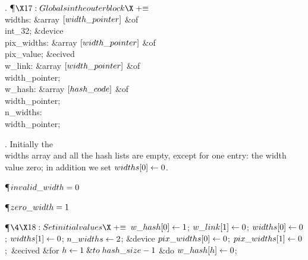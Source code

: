 . \P$\X17:Globals in the outer block\X\mathrel{+}\S$\6
\4\\{widths}: \&{array} $[\\{width\_pointer}]$ \1\&{of}\5
\\{int\_32};\2\6
\&{device} \\{pix\_widths}: \&{array} $[\\{width\_pointer}]$ \1\&{of}\5
\\{pix\_value};\2\6
\&{ecived}\6
\4\\{w\_link}: \&{array} $[\\{width\_pointer}]$ \1\&{of}\5
\\{width\_pointer};\2\6
\4\\{w\_hash}: \&{array} $[\\{hash\_code}]$ \1\&{of}\5
\\{width\_pointer};\2\6
\4\\{n\_widths}: \\{width\_pointer};\par
\fi

. Initially the \\{widths} array and all the hash lists are empty, except
for one entry: the width value zero; in addition we set $\\{widths}[0]\gets0$.

\Y\P\D {}$\\{invalid\_width}=0$\par
\P\D {}$\\{zero\_width}=1$\par
\Y\P$\4\X18:Set initial values\X\mathrel{+}\S$\6
$\\{w\_hash}[0]\gets1$;\5
$\\{w\_link}[1]\gets0$;\5
$\\{widths}[0]\gets0$;\5
$\\{widths}[1]\gets0$;\5
$\\{n\_widths}\gets2$;\6
\&{device} $\\{pix\_widths}[0]\gets0$;\5
$\\{pix\_widths}[1]\gets0$;\ \&{ecived}\6
\&{for} $\hbox{$h$}\gets1\mathrel{\&{to}}\\{hash\_size}-1$ \1\&{do}\5
$\\{w\_hash}[\hbox{$h$}]\gets0$;\2\par
\fi

